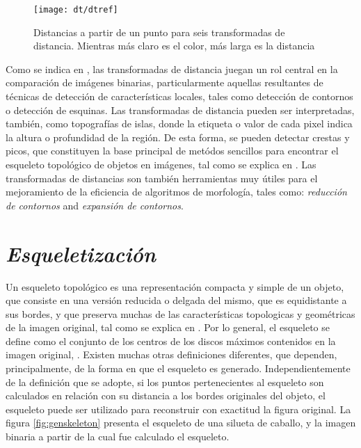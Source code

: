 \begin{figure}[h t b p ! H]
 \centering
   \texttt{[image: dt/dtref]}
 \caption[Distancias a partir de un punto para seis transformadas de distancia]{ 
   Distancias a partir de un punto para seis transformadas de distancia. Mientras 
   m\'as claro es el color, m\'as larga es la distancia \cite[p.365]{dtresearch}}
 \label{fig:dtexamples}
\end{figure}

Como se indica en \cite{dtresearch2}, las transformadas de distancia juegan un rol
central en la comparaci\'on de im\'agenes binarias, particularmente aquellas
resultantes de t\'ecnicas de detecci\'on de caracter\'isticas locales, tales 
como detecci\'on de contornos o detecci\'on de esquinas.
Las transformadas de distancia pueden ser interpretadas, tambi\'en, como
topograf\'ias de islas, donde la etiqueta o valor de cada pixel indica la altura o 
profundidad de la regi\'on. De esta forma, se pueden detectar crestas y picos, 
que constituyen la base principal de met\'odos sencillos para encontrar el 
esqueleto topol\'ogico de objetos en im\'agenes, tal como se explica en \cite[237]{ridgedt}.
Las transformadas de distancias son tambi\'en herramientas muy \'utiles para el 
mejoramiento de la eficiencia de algoritmos de morfolog\'ia, tales como: 
\emph{reducci\'on de contornos} and \emph{expansi\'on de contornos}.\\

\section{\emph{Esqueletizaci\'on}}
\label{sec:skeletonization}

Un esqueleto topol\'ogico es una representaci\'on compacta y simple de un objeto, que
consiste en una versi\'on reducida o delgada del mismo, que es equidistante a sus bordes, 
y que preserva muchas de las caracter\'isticas topologicas y geom\'etricas de la
imagen original, tal como se explica en \cite{wikipedia:skeleton,ssm,augmented}. 
Por lo general, el esqueleto se define como el conjunto de los centros de los discos m\'aximos
contenidos en la imagen original, \cite{ssm,augmented}. Existen muchas otras definiciones diferentes,
que dependen, principalmente, de la forma en que el esqueleto es generado.
Independientemente de la definici\'on que se adopte, si los puntos pertenecientes al esqueleto
son calculados en relaci\'on con su distancia a los bordes originales del objeto, 
el esqueleto puede ser utilizado para reconstruir con exactitud la figura original.
La figura \ref{fig:genskeleton} presenta el esqueleto de una silueta de caballo, y la
imagen binaria a partir de la cual fue calculado el esqueleto.

